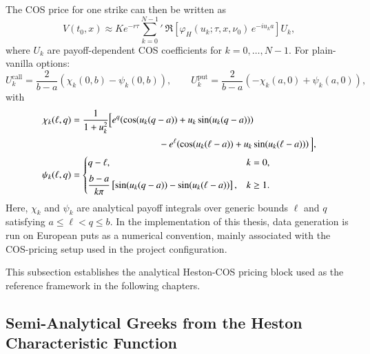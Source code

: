 The COS price for one strike can then be written as
\begin{equation}
    V(t_0,x)\approx Ke^{-r\tau}\sum_{k=0}^{N-1}\!'\ \Re\!\left[\varphi_H(u_k;\tau,x,\nu_0)\,e^{-iu_ka}\right]U_k,
\end{equation}
where $U_k$ are payoff-dependent COS coefficients for $k=0,\ldots,N-1$. For plain-vanilla options:
\begin{equation}
    U_k^{\mathrm{call}}=\frac{2}{b-a}\left(\chi_k(0,b)-\psi_k(0,b)\right),\qquad
    U_k^{\mathrm{put}}=\frac{2}{b-a}\left(-\chi_k(a,0)+\psi_k(a,0)\right),
\end{equation}
with
\begin{equation}
\begin{aligned}
    \chi_k(\ell,q)
    &=\frac{1}{1+u_k^2}\Big[
        e^q\!\left(\cos(u_k(q-a))+u_k\sin(u_k(q-a))\right)\\
    &\hspace{3.2cm}
        -e^\ell\!\left(\cos(u_k(\ell-a))+u_k\sin(u_k(\ell-a))\right)
    \Big],\\
    \psi_k(\ell,q)
    &=
    \begin{cases}
        q-\ell, & k=0,\\[2mm]
        \dfrac{b-a}{k\pi}\left[\sin(u_k(q-a))-\sin(u_k(\ell-a))\right], & k\ge 1.
    \end{cases}
\end{aligned}
\end{equation}
Here, $\chi_k$ and $\psi_k$ are analytical payoff integrals over generic bounds $\ell$ and $q$ satisfying $a\le \ell<q\le b$.
In the implementation of this thesis, data generation is run on European puts as a numerical convention, mainly associated with the COS-pricing setup used in the project configuration.

This subsection establishes the analytical Heston-COS pricing block used as the reference framework in the following chapters.

\subsection{Semi-Analytical Greeks from the Heston Characteristic Function}
\label{sec:heston_cf_greeks}

